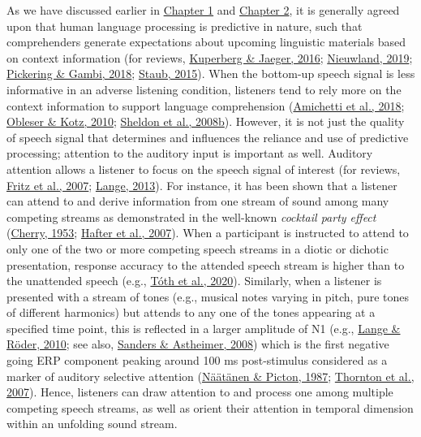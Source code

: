 \documentclass[a4paper, nobind]{templates/ociamthesis}
\begin{document}
As we have discussed earlier in \protect\hyperlink{chapter-introduction}{Chapter 1} and \protect\hyperlink{chapter-background}{Chapter 2}, it is generally agreed upon that human language processing is predictive in nature, such that comprehenders generate expectations about upcoming linguistic materials based on context information (for reviews, \protect\hyperlink{ref-Kuperberg2016}{Kuperberg \& Jaeger, 2016}; \protect\hyperlink{ref-Nieuwland2019}{Nieuwland, 2019}; \protect\hyperlink{ref-Pickering2018}{Pickering \& Gambi, 2018}; \protect\hyperlink{ref-Staub2015}{Staub, 2015}).
When the bottom-up speech signal is less informative in an adverse listening condition, listeners tend to rely more on the context information to support language comprehension (\protect\hyperlink{ref-Amichetti2018}{Amichetti et al., 2018}; \protect\hyperlink{ref-Obleser2010}{Obleser \& Kotz, 2010}; \protect\hyperlink{ref-Sheldon2008b}{Sheldon et al., 2008b}).
However, it is not just the quality of speech signal that determines and influences the reliance and use of predictive processing;
attention to the auditory input is important as well.
Auditory attention allows a listener to focus on the speech signal of interest (for reviews, \protect\hyperlink{ref-Fritz2007}{Fritz et al., 2007}; \protect\hyperlink{ref-Lange2013}{Lange, 2013}).
For instance, it has been shown that a listener can attend to and derive information from one stream of sound among many competing streams as demonstrated in the well-known \emph{cocktail party effect} (\protect\hyperlink{ref-Cherry1953}{Cherry, 1953}; \protect\hyperlink{ref-Hafter2007}{Hafter et al., 2007}).
When a participant is instructed to attend to only one of the two or more competing speech streams in a diotic or dichotic presentation, response accuracy to the attended speech stream is higher than to the unattended speech (e.g., \protect\hyperlink{ref-Toth2020}{Tóth et al., 2020}).
Similarly, when a listener is presented with a stream of tones (e.g., musical notes varying in pitch, pure tones of different harmonics) but attends to any one of the tones appearing at a specified time point, this is reflected in a larger amplitude of N1 (e.g., \protect\hyperlink{ref-Lange2010}{Lange \& Röder, 2010}; see also, \protect\hyperlink{ref-Sanders2008}{Sanders \& Astheimer, 2008})
which is the first negative going ERP component peaking around 100 ms post-stimulus considered as a marker of auditory selective attention (\protect\hyperlink{ref-Naatanen1987}{Näätänen \& Picton, 1987}; \protect\hyperlink{ref-Thornton2007}{Thornton et al., 2007}).
Hence, listeners can draw attention to and process one among multiple competing speech streams,
as well as orient their attention in temporal dimension within an unfolding sound stream.
\end{document}
